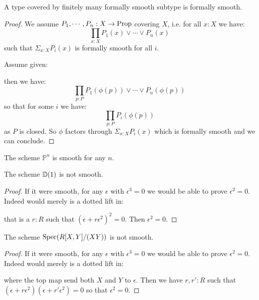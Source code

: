 \begin{lemma}
A type covered by finitely many formally smooth subtype is formally smooth.
\end{lemma}
\begin{proof}
We assume $P_1,\cdots,P_n:X\to \mathrm{Prop}$ covering $X$, i.e. for all $x:X$ we have:
\[
\prod_{x:X}P_1(x)\lor\cdots\lor P_n(x)
\]
such that $\Sigma_{x:X}P_i(x)$ is formally smooth for all $i$.

Assume given:
   \begin{center}
    \end{center}
   then we have:
   \[\prod_{p:P} P_1(\phi(p))\lor\cdots\lor P_n(\phi(p))\]
   so that for some $i$ we have:
      \[\prod_{p:P} P_i(\phi(p))\]
as $P$ is closed. So $\phi$ factors through $\Sigma_{x:X}P_i(x)$ which is formally smooth and we can conclude. %
\end{proof}

\begin{corollary}
The scheme $\mathbb{P}^n$ is smooth for any $n$.
\end{corollary}

\begin{lemma}
The scheme $\mathbb{D}(1)$ is not smooth.
\end{lemma}

\begin{proof}
If it were smooth, for any $\epsilon$ with $\epsilon^3=0$ we would be able to prove $\epsilon^2=0$. Indeed would merely is a dotted lift in:
 \begin{center}
    \end{center}
    that is a $r:R$ such that $(\epsilon+r\epsilon^2)^2=0$. Then $\epsilon^2=0$.
\end{proof}

\begin{lemma}
The scheme $\operatorname{Spec}(R[X,Y]/(XY))$ is not smooth.
\end{lemma}

\begin{proof}
If it were smooth, for any $\epsilon$ with $\epsilon^3=0$ we would be able to prove $\epsilon^2=0$. Indeed would merely is a dotted lift in:
 \begin{center}
    \end{center}
    where the top map send both $X$ and $Y$ to $\epsilon$. Then we have $r,r':R$ such that $(\epsilon+r\epsilon^2)(\epsilon+r'\epsilon^2)=0$ so that $\epsilon^2=0$. %
\end{proof}

